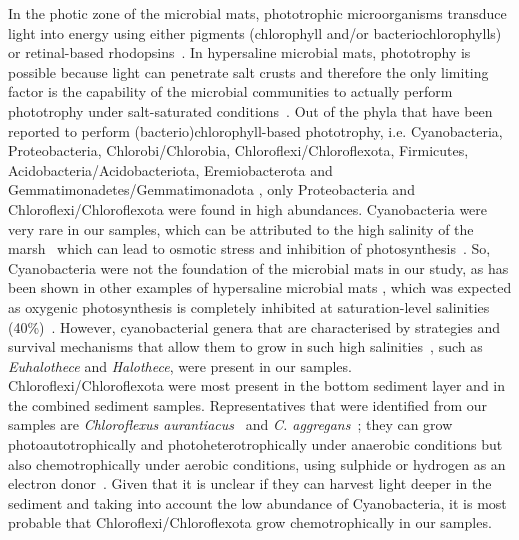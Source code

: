    In the photic zone of the microbial mats, phototrophic microorganisms transduce light into energy 
   using either pigments 
   (chlorophyll and/or bacteriochlorophylls) or retinal-based rhodopsins~\citep{kurth_carbon_2021}. 
   In hypersaline microbial mats, phototrophy is possible because light can penetrate salt crusts and therefore 
   the only limiting factor is the capability of the microbial communities to actually perform 
   phototrophy under salt-saturated conditions~\citep{meier_limitation_2021}. 
   Out of the phyla that have been reported to perform (bacterio)chlorophyll-based phototrophy, 
   i.e. Cyanobacteria, Proteobacteria, Chlorobi/Chlorobia, Chloroflexi/Chloroflexota, Firmicutes, 
   Acidobacteria/Acidobacteriota, 
   Eremiobacterota and Gemmatimonadetes/Gemmatimonadota 
   \citep{zeng_phototrophic_2017, zheng_characterization_2022}, 
   only Proteobacteria and Chloroflexi/Chloroflexota were found in high abundances. 
   Cyanobacteria were very rare in our samples, which can be attributed to the 
   high salinity of the marsh~\citep{diloreto_microbial_2019} 
   which can lead to osmotic stress and inhibition of photosynthesis~\citep{sudhir_effects_2004}. 
   So, Cyanobacteria were not the foundation of the microbial mats in our study, 
   as has been shown in other examples of hypersaline microbial mats 
   \citep{bolhuis_molecular_2014, wong_molecular_2016}, 
   which was expected as oxygenic photosynthesis is completely inhibited
   at saturation-level salinities (40\%)~\citep{meier_limitation_2021}. 
   However, cyanobacterial genera that are characterised by strategies and survival mechanisms 
   that allow them to grow in such high salinities~\citep{oren_cyanobacteria_2015}, 
   such as \textit{Euhalothece} and \textit{Halothece}, were present in our samples. 
   Chloroflexi/Chloroflexota were most present in the bottom sediment layer and 
   in the combined sediment samples. 
   Representatives that were identified from our samples are 
   \textit{Chloroflexus aurantiacus}~\citep{pierson_phototrophic_1974}
   and \textit{C. aggregans}~\citep{hanada_chloroflexus_1995}; 
   they can grow photoautotrophically and photoheterotrophically 
   under anaerobic conditions but also chemotrophically under aerobic conditions, 
   using sulphide or hydrogen as an electron donor~\citep{tang_complete_2011, kawai_hydrogen-dependent_2019, kawai_-situ_2021}. 
   Given that it is unclear if they can harvest light deeper in the sediment and taking into account 
   the low abundance of Cyanobacteria, it is most probable that Chloroflexi/Chloroflexota grow chemotrophically in our samples. 
